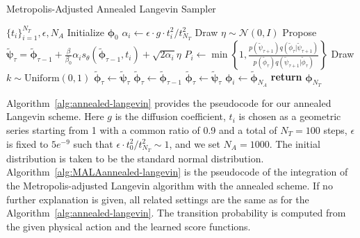 \documentclass[a4paper,11pt]{article}
\begin{document}
\begin{algorithm}[hbtp!]
\caption{Metropolis-Adjusted Annealed Langevin Sampler}
\label{alg:MALAannealed-langevin}
\begin{algorithmic}[1] 
    \Require $\{t_i\}_{i=1}^{N_T}, \epsilon, N_A$
    \State Initialize ${\mathbf{\phi}}_0$
        \State $\alpha_i \leftarrow \epsilon \cdot g \cdot t_i^2 / t_{N_T}^2$ 
            \State Draw $\eta \sim \mathcal{N}(0, I)$
            \State Propose $\tilde{\mathbf{\psi}}_\tau = \tilde{\mathbf{\phi}}_{\tau-1} + \frac{\beta}{\beta_0} \alpha_i s_\theta(\tilde{\mathbf{\phi}}_{\tau-1}, t_i) + \sqrt{2\alpha_i} \eta$
                \State $P_i \leftarrow \min\left\{1, \frac{p(\tilde{\psi}_{\tau+1}) q(\tilde{\phi}_\tau|\tilde{\psi}_{\tau+1})}{p(\tilde{\phi}_\tau) q(\tilde{\psi}_{\tau+1}|{\tilde{\phi}_\tau})} \right\}$
                \State Draw $k \sim \mathrm{Uniform}(0,1)$
                    \State$\tilde{\mathbf{\phi}}_\tau \leftarrow \tilde{\mathbf{\psi}}_{\tau}$
                \Else
                    \State $\tilde{\mathbf{\phi}}_\tau \leftarrow \tilde{\mathbf{\phi}}_{\tau-1}$
                \EndIf
            \Else
                \State$\tilde{\mathbf{\phi}}_\tau \leftarrow \tilde{\mathbf{\psi}}_{\tau}$
            \EndIf
        \EndFor
        \State ${\mathbf{\phi}}_{i} \leftarrow \tilde{\mathbf{\phi}}_{N_A}$
    \EndFor
    \State \textbf{return} ${\mathbf{\phi}}_{N_T}$
\end{algorithmic}
\end{algorithm}
Algorithm~\ref{alg:annealed-langevin} provides the pseudocode for our annealed Langevin scheme. Here $g$ is the diffusion coefficient, ${t_i}$ is chosen as a geometric series starting from 1 with a common ratio of 0.9 and a total of $N_T=100$ steps, $\epsilon$ is fixed to $5e^{-9}$ such that $\epsilon \cdot t_0^2 / t_{N_T}^2 \sim 1$, and we set $N_A=1000$. The initial distribution is taken to be the standard normal distribution. Algorithm~\ref{alg:MALAannealed-langevin} is the pseudocode of the integration of the Metropolis-adjusted Langevin algorithm with the annealed scheme. If no further explanation is given, all related settings are the same as for the Algorithm~\ref{alg:annealed-langevin}. The transition probability is computed from the given physical action and the learned score functions.
\end{document}
